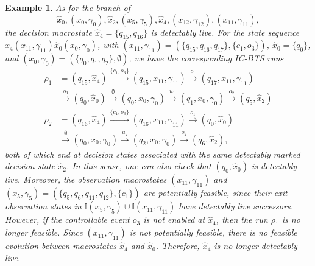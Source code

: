 \documentclass[twocolumn]{autart}
\newtheorem{myexm}{Example}
\begin{document}
\begin{myexm}
As for the branch of 
$$
\hat{x}_{0}, (x_0, \gamma_0), \hat{x}_{2}, (x_5, \gamma_5), \hat{x}_{4}, (x_{12}, \gamma_{12}), (x_{11}, \gamma_{11}),
$$
the decision macrostate $\hat{x}_{4} = \{ q_{15}, q_{16} \}$ is detectably live.
For the state sequence $\hat{x}_{4} (x_{11}, \gamma_{11}) \hat{x}_{0} (x_0, \gamma_0)$, with $(x_{11}, \gamma_{11}) = (\{ q_{15}, q_{16}, q_{17}\}, \{c_1, o_3\})$, $\hat{x}_{0} = \{ q_0 \}$, and $(x_{0}, \gamma_{0}) = (\{ q_0, q_1, q_2 \}, \emptyset)$, we have the corresponding IC-BTS runs
$$
\begin{aligned}
\rho_1 &= 
(q_{15}, \hat{x}_{4}) \xrightarrow{\{c_1, o_3\}} (q_{15}, x_{11}, \gamma_{11}) \xrightarrow{c_1} (q_{17}, x_{11}, \gamma_{11}) \\
&\xrightarrow{o_3} (q_0, \hat{x}_{0}) \xrightarrow{\emptyset} (q_0, x_{0}, \gamma_{0}) \xrightarrow{u_1} (q_1, x_{0}, \gamma_{0}) \xrightarrow{o_2} (q_5, \hat{x}_2) \\
\rho_2 &= 
(q_{16}, \hat{x}_{4}) \xrightarrow{\{c_1, o_3\}} (q_{16}, x_{11}, \gamma_{11}) \xrightarrow{o_1} (q_0, \hat{x}_{0}) \\
&\xrightarrow{\emptyset}  (q_0, x_{0}, \gamma_{0}) \xrightarrow{u_2} (q_2, x_{0}, \gamma_{0}) \xrightarrow{o_2} (q_6, \hat{x}_2),
\end{aligned}
$$
both of which end at decision states associated with the same detectably marked decision state $\hat{x}_{2}$.
%
In this sense, one can also check that $(q_0, \hat{x}_{0})$ is detectably live.
Moreover, the observation macrostates $(x_{11}, \gamma_{11})$ and $(x_{5}, \gamma_{5}) = (\{q_5, q_6, q_{11}, q_{12}\}, \{ c_1 \})$ are potentially feasible, since their exit observation states in 
$
\mathbb{I}(x_5,\gamma_5)\cup \mathbb{I}(x_{11},\gamma_{11})
$
have detectably live successors.
However, if the controllable event $o_3$ is not enabled at $\hat{x}_{4}$, then the run $\rho_{1}$ is no longer feasible.
%
%
Since $(x_{11}, \gamma_{11})$ is not potentially feasible, there is no feasible evolution between macrostates $\hat{x}_4$ and $\hat{x}_0$.
Therefore, $\hat{x}_{4}$ is no longer detectably live.
%  
%
%
\end{myexm}
\end{document}
